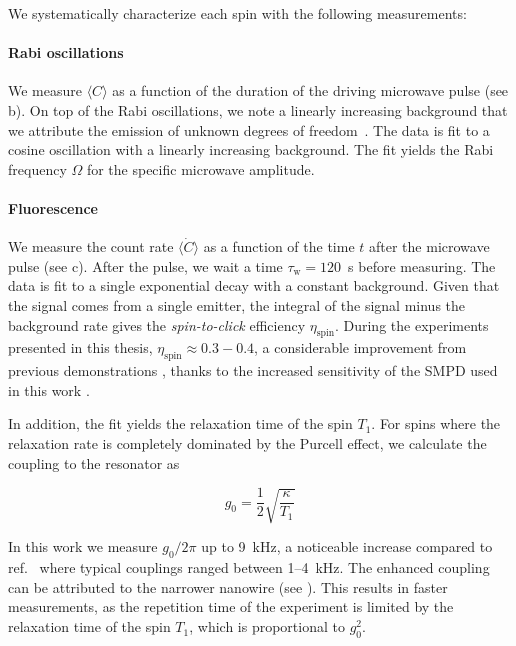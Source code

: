 We systematically characterize each \Er spin with the following measurements: 

\paragraph{Rabi oscillations} We measure $\langle C\rangle$ as a function of the duration of the driving microwave pulse (see b). On top of the Rabi oscillations, we note a linearly increasing background that we attribute the emission of unknown degrees of freedom~. The data is fit to a cosine oscillation with a linearly increasing background. The fit yields the Rabi frequency $\Omega$ for the specific microwave amplitude.

\paragraph{Fluorescence} We measure the count rate $\langle \dot C\rangle$ as a function of the time $t$ after the microwave pulse (see c). After the pulse, we wait a time $\tau_\text{w}=120$~\textmu s before measuring. The data is fit to a single exponential decay with a constant background. Given that the signal comes from a single emitter, the integral of the signal minus the background rate gives the \textit{spin-to-click} efficiency $\eta_\text{spin}$. During the experiments presented in this thesis, $\eta_\text{spin}\approx0.3-0.4$, a considerable improvement from previous demonstrations , thanks to the increased sensitivity of the SMPD used in this work . 

In addition, the fit yields the relaxation time of the spin $T_1$. For spins where the relaxation rate is completely dominated by the Purcell effect, we calculate the coupling to the resonator as 

\begin{equation}
    g_0 = \frac12 \sqrt{\frac{\kappa}{T_1}}
\end{equation}

In this work we measure $g_0/2\pi$ up to 9~kHz, a noticeable increase compared to ref.~ where typical couplings ranged between 1--4~kHz. The enhanced coupling can be attributed to the narrower nanowire (see ). This results in faster measurements, as the repetition time of the experiment is limited by the relaxation time of the spin $T_1$, which is proportional to $g_0^2$.

